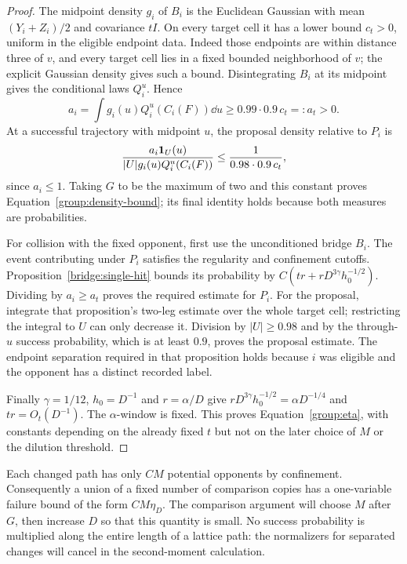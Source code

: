 \begin{proof}
The midpoint density $g_i$ of $B_i$ is the Euclidean Gaussian with
mean $(Y_i+Z_i)/2$ and covariance $tI$.  On every target cell it has
a lower bound $c_t>0$, uniform in the eligible endpoint data.  Indeed
those endpoints are within distance three of $v$, and every target
cell lies in a fixed bounded neighborhood of $v$; the explicit
Gaussian density gives such a bound.  Disintegrating $B_i$ at its
midpoint gives the conditional laws $Q_i^u$.  Hence
\[
 a_i=\int g_i(u)Q_i^u(C_i(F))\dd u
 \ge 0.99\cdot0.9\,c_t=:a_t>0.
\]
At a successful trajectory with midpoint $u$, the proposal density
relative to $P_i$ is
\[
 \frac{a_i\mathbf 1_U(u)}{|U|g_i(u)Q_i^u(C_i(F))}
 \le \frac1{0.98\cdot0.9\,c_t},
\]
since $a_i\le1$.  Taking $G$ to be the maximum of two and this
constant proves Equation~\eqref{group:density-bound}; its final
identity holds because both measures are probabilities.

For collision with the fixed opponent, first use the unconditioned
bridge $B_i$.  The event contributing under $P_i$ satisfies the
regularity and confinement cutoffs.  Proposition~\ref{bridge:single-hit}
bounds its probability by
$C(tr+rD^{3\gamma}h_0^{-1/2})$.  Dividing by $a_i\ge a_t$
proves the required estimate for $P_i$.
For the proposal, integrate that proposition's two-leg estimate over the
whole target cell; restricting the integral to $U$ can only decrease
it.  Division by $|U|\ge0.98$ and by the through-$u$ success
probability, which is at least $0.9$, proves the proposal estimate.
The endpoint separation required in that proposition holds because $i$ was
eligible and the opponent has a distinct recorded label.

Finally $\gamma=1/12$, $h_0=D^{-1}$ and $r=\alpha/D$ give
$rD^{3\gamma}h_0^{-1/2}=\alpha D^{-1/4}$ and $tr=O_t(D^{-1})$.
The $\alpha$-window is fixed.  This proves
Equation~\eqref{group:eta}, with constants depending on the already
fixed $t$ but not on the later choice of $M$ or the dilution threshold.
\end{proof}

Each changed path has only $CM$ potential opponents by confinement.
Consequently a union of a fixed number of comparison copies has a
one-variable failure bound of the form $CM\eta_D$.  The comparison
argument will choose $M$ after $G$, then increase $D$ so that this
quantity is small.  No success probability is multiplied along the
entire length of a lattice path: the normalizers for separated changes
will cancel in the second-moment calculation.
